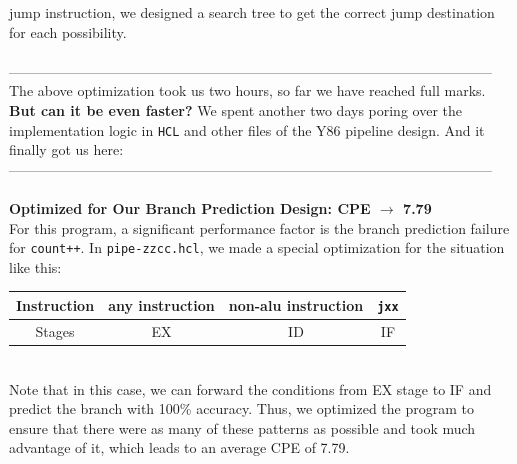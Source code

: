 \documentclass{article}
\begin{document}
jump instruction, we designed a search tree to get the correct jump destination for each possibility.
\\
\\
--------------------------------------------------------------------------------------------------------\\
The above optimization took us two hours, so far we have reached full marks.\\
\textbf{But can it be even faster?}
We spent another two days poring over the implementation logic in \texttt{HCL} and other files of the Y86 pipeline design. And it finally got us here:\\
--------------------------------------------------------------------------------------------------------\\
\\
{\color{red}\textbf{Optimized for Our Branch Prediction Design: CPE $\rightarrow$ 7.79}} \\
For this program, a significant performance factor is the branch prediction failure for \texttt{count++}.
In \texttt{pipe-zzcc.hcl}, we made a special optimization for the situation like this:\\
\begin{tabular}{|c|c|c|c|}
        \hline Instruction&any instruction&non-alu instruction&\texttt{jxx}\\
        \hline Stages&EX&ID&IF\\
        \hline
\end{tabular}
\\
Note that in this case, we can forward the conditions from EX stage to IF and predict the branch with 100\% accuracy. 
Thus, we optimized the program to ensure that there were as many of these patterns as 
possible and took much advantage of it, which leads to an average CPE of 7.79.
\end{document}

